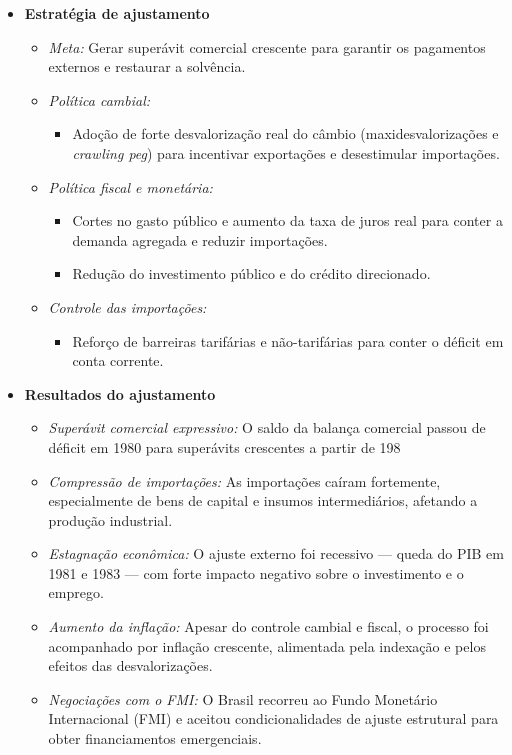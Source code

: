 \documentclass{sciposter}
\begin{document}
\begin{multicols}{3}
\begin{itemize}
    \item \textbf{ Estratégia de ajustamento}
    \begin{itemize}
        \item \textit{Meta:} Gerar superávit comercial crescente para garantir os pagamentos externos e restaurar a solvência.
        \item \textit{Política cambial:} 
        \begin{itemize}
            \item Adoção de forte desvalorização real do câmbio (maxidesvalorizações e \textit{crawling peg}) para incentivar exportações e desestimular importações.
        \end{itemize}
        \item \textit{Política fiscal e monetária:}
        \begin{itemize}
            \item Cortes no gasto público e aumento da taxa de juros real para conter a demanda agregada e reduzir importações.
            \item Redução do investimento público e do crédito direcionado.
        \end{itemize}
        \item \textit{Controle das importações:}
        \begin{itemize}
            \item Reforço de barreiras tarifárias e não-tarifárias para conter o déficit em conta corrente.
        \end{itemize}
    \end{itemize}

    \item \textbf{ Resultados do ajustamento}
    \begin{itemize}
        \item \textit{Superávit comercial expressivo:} O saldo da balança comercial passou de déficit em 1980 para superávits crescentes a partir de 198
        \item \textit{Compressão de importações:} As importações caíram fortemente, especialmente de bens de capital e insumos intermediários, afetando a produção industrial.
        \item \textit{Estagnação econômica:} O ajuste externo foi recessivo — queda do PIB em 1981 e 1983 — com forte impacto negativo sobre o investimento e o emprego.
        \item \textit{Aumento da inflação:} Apesar do controle cambial e fiscal, o processo foi acompanhado por inflação crescente, alimentada pela indexação e pelos efeitos das desvalorizações.
        \item \textit{Negociações com o FMI:} O Brasil recorreu ao Fundo Monetário Internacional (FMI) e aceitou condicionalidades de ajuste estrutural para obter financiamentos emergenciais.
    \end{itemize}


\end{itemize}
\end{multicols}
\end{document}
